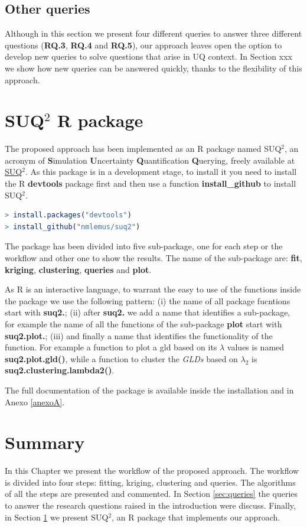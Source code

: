 \subsection{Other queries}
Although in this section we present four different queries to answer three different questions (\textbf{RQ.3}, \textbf{RQ.4} and \textbf{RQ.5}), our approach leaves open the option to develop new queries to solve questions that arise in UQ context. In Section xxx  we show how new queries can be answered quickly, thanks to the flexibility of this approach.

\section{SUQ$^2$ R package}\label{sec:suq2}
The proposed approach has been implemented as an R package named SUQ$^2$, an acronym of \textbf{S}imulation \textbf{U}ncertainty \textbf{Q}uantification \textbf{Q}uerying, freely available at \href{https://github.com/nmlemus/suq2}{SUQ$^2$}. As this package is in a development stage, to install it you need to install the R \textbf{devtools} package first and then use a function \textbf{install\_github} to install SUQ$^2$.

\begin{lstlisting}[language=r]
> install.packages("devtools")
> install_github("nmlemus/suq2")
\end{lstlisting}

The package has been divided into five sub-package, one for each step or the workflow and other one to show the results. The name of the sub-package are: \textbf{fit}, \textbf{kriging}, \textbf{clustering}, \textbf{queries} and \textbf{plot}.

As R is an interactive language, to warrant the easy to use of the functions inside the package we use the following pattern: (i) the name of all package fucntions start with \textbf{suq2.}; (ii) after \textbf{suq2.} we add a name that identifies a sub-package, for example the name of all the functions of the sub-package \textbf{plot} start with \textbf{suq2.plot.}; (iii) and finally a name that identifies the functionality of the function. For example a function to plot a gld based on its $\lambda$ values is named \textbf{suq2.plot.gld()}, while a function to cluster the \textit{GLDs} based on $\lambda_{2}$ is \textbf{suq2.clustering.lambda2()}.

The full documentation of the package is available inside the installation and in Anexo \ref{anexoA}.

\section{Summary}\label{sec:approach_summary}
In this Chapter we present the workflow of the proposed approach. The workflow is divided into four steps: fitting, kriging, clustering and queries. The algorithms of all the steps are presented and commented. In Section \ref{sec:queries} the queries to answer the research questions raised in the introduction were discuss. Finally, in Section \ref{sec:suq2} we present SUQ$^2$, an R package that implements our approach.  